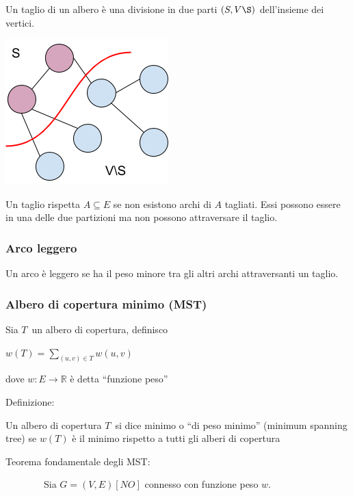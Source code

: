 \documentclass{article}
\begin{document}
{Un taglio di un albero è una divisione in due parti $(S,V\S)$ dell'insieme dei vertici.}

{}

{\includegraphics{images/image527.png}}

{}

{Un taglio rispetta $A \subseteq E$ se non
esistono archi di $A$ tagliati. Essi possono essere in una delle due partizioni ma non possono attraversare il taglio.}

\hypertarget{h.gfycwx7ubmbv}{\subsubsection{\texorpdfstring{{Arco
leggero}}{Arco leggero}}\label{h.gfycwx7ubmbv}}

{Un arco è leggero se ha il peso minore tra gli altri archi
attraversanti un taglio.}

\hypertarget{h.1evqcdl7exzv}{\subsubsection{\texorpdfstring{{Albero di
copertura minimo
(MST)}}{Albero di copertura minimo (MST)}}\label{h.1evqcdl7exzv}}

{Sia }$T${~un albero di copertura,
definisco}

$w(T) = \sum_{(u,v)\in T}{w(u,v)}$

{dove $w:E\rightarrow \mathbb{R}$ è detta ``funzione peso''
}

{Definizione:}

{Un albero di copertura }$T${~si dice minimo o ``di peso minimo'' (minimum spanning tree) se $w(T)$ è il minimo rispetto a tutti gli alberi di copertura}

{Teorema fondamentale degli MST}{:}

{~~~~~~~~Sia }$G=(V,E) [NO]$ {connesso con
funzione peso }$w${.}
\end{document}
